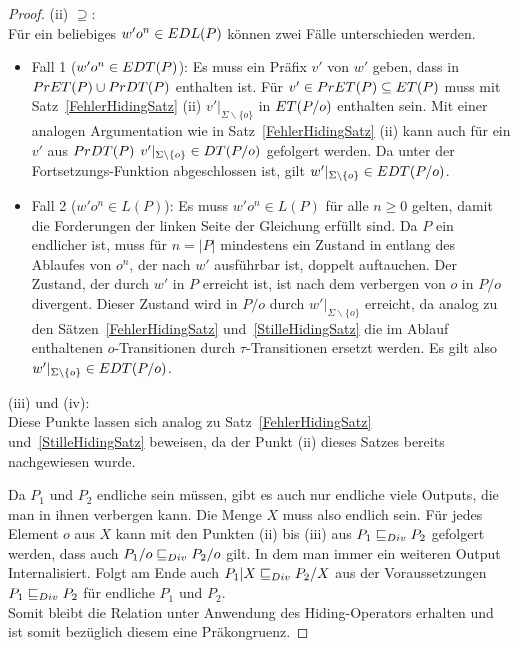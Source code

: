 \begin{proof}
  (ii)  \glqq $\supseteq$\grqq{}:\\
  Für ein beliebiges $w'o^n\in EDL (P)$ können zwei Fälle unterschieden
  werden.
  \begin{itemize}
    \item Fall 1 ($w'o^n\in EDT (P)$): Es muss ein Präfix $v'$ von $w'$ geben,
      dass in $PrET (P)\cup PrDT (P)$ enthalten ist. Für $v'\in PrET (P)
      \subseteq ET (P)$ muss mit Satz~\ref{FehlerHidingSatz} (ii)
      $v'|_{\Sigma\backslash\{o\}}$ in $ET (P/o)$ enthalten sein. Mit einer
      analogen Argumentation wie in Satz~\ref{FehlerHidingSatz} (ii) kann auch
      für ein $v'$ aus $PrDT (P)$ $v'|_{\Sigma\backslash\{o\}}\in DT (P/o)$
      gefolgert werden. Da \EDT{} unter der Fortsetzungs-Funktion \cont{}
      abgeschlossen ist, gilt $w'|_{\Sigma\backslash\{o\}}\in EDT (P/o)$.
    \item Fall 2 ($w'o^n\in L (P)$): Es muss $w'o^n\in L(P)$ für alle $n\geq 0$
      gelten, damit die Forderungen der linken Seite der Gleichung erfüllt
      sind. Da $P$ ein endlicher \MEIO{} ist, muss für $n =|P|$ mindestens ein
      Zustand in entlang des Ablaufes von $o^n$, der nach $w'$ ausführbar ist,
      doppelt auftauchen. Der Zustand, der durch $w'$ in $P$ erreicht ist, ist
      nach dem verbergen von $o$ in $P/o$ divergent. Dieser Zustand wird in
      $P/o$ durch $w'|_{\Sigma\backslash\{o\}}$ erreicht, da analog zu den
      Sätzen~\ref{FehlerHidingSatz} und~\ref{StilleHidingSatz} die im Ablauf
      enthaltenen $o$-Transitionen durch $\tau$-Transitionen ersetzt werden. Es
      gilt also $w'|_{\Sigma\backslash\{o\}}\in EDT (P/o)$.
  \end{itemize}

  (iii) und (iv):\\
  Diese Punkte lassen sich analog zu Satz~\ref{FehlerHidingSatz}
  und~\ref{StilleHidingSatz} beweisen, da der Punkt (ii) dieses Satzes bereits
  nachgewiesen wurde.

  Da $P_1$ und $P_2$ endliche sein müssen, gibt es auch nur endliche viele
  Outputs, die man in ihnen verbergen kann. Die Menge $X$ muss also endlich
  sein. Für jedes Element $o$ aus $X$ kann mit den Punkten (ii) bis (iii) aus
  $P_1 \sqsubseteq  _{Div} P_2$ gefolgert werden, dass auch $P_1/o \sqsubseteq  _{Div} P_2/o$ gilt. In dem
  man immer ein weiteren Output Internalisiert. Folgt am Ende auch $P_1|X \sqsubseteq  _{Div}
  P_2/X$ aus der Voraussetzungen $P_1 \sqsubseteq  _{Div} P_2$ für endliche \MEIO{} $P_1$ und
  $P_2$.\\
  Somit bleibt die Relation \DRel{} unter Anwendung des Hiding-Operators
  erhalten und ist somit bezüglich diesem eine Präkongruenz.
\end{proof}

